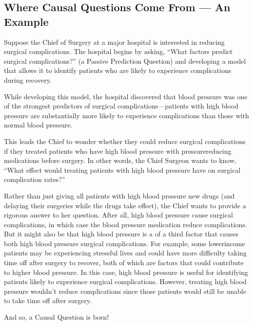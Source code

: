 \documentclass[letterpaper,10pt,english]{jupyterBook}
\begin{document}
\subsection{Where Causal Questions Come From — An Example}
\label{\detokenize{30_questions/35_using_causal_questions:where-causal-questions-come-from-an-example}}
\sphinxAtStartPar
Suppose the Chief of Surgery at a major hospital is interested in reducing surgical complications. The hospital begins by asking, “What factors predict surgical complications?” (a Passive Prediction Question) and developing a model that allows it to identify patients who are likely to experience complications during recovery.

\sphinxAtStartPar
While developing this model, the hospital discovered that blood pressure was one of the strongest predictors of surgical complications—patients with high blood pressure are substantially more likely to experience complications than those with normal blood pressure.

\sphinxAtStartPar
This leads the Chief to wonder whether they could reduce surgical complications if they treated patients who have high blood pressure with pressure\sphinxhyphen{}reducing medications before surgery. In other words, the Chief Surgeon wants to know, “What effect would treating patients with high blood pressure have on surgical complication rates?”

\sphinxAtStartPar
Rather than just giving all patients with high blood pressure new drugs (and delaying their surgeries while the drugs take effect), the Chief wants  to provide a rigorous answer to her question. After all, high blood pressure  cause surgical complications, in which case the blood pressure medication  reduce complications. But it might also be that high blood pressure is a  of a third factor that causes both high blood pressure  surgical complications. For example, some lower\sphinxhyphen{}income patients may be experiencing stressful lives and could have more difficulty taking time off after surgery to recover, both of which are factors that could contribute to higher blood pressure. In this case, high blood pressure is useful for identifying patients likely to experience surgical complications. However, treating high blood pressure wouldn’t reduce complications since those patients would still be unable to take time off after surgery.

\sphinxAtStartPar
And so, a Causal Question is born!
\end{document}
